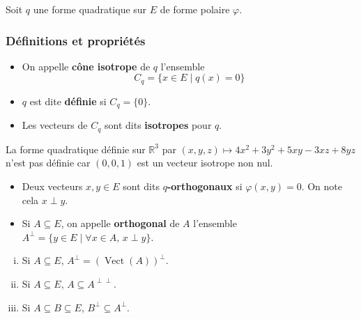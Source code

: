 	Soit $q$ une forme quadratique sur $E$ de forme polaire $\varphi$.

	\subsubsection{Définitions et propriétés}

	\begin{definition}
		\begin{itemize}
			\item On appelle \textbf{cône isotrope} de $q$ l'ensemble
			\[ C_q = \{ x \in E \mid q(x) = 0 \} \]
			\item $q$ est dite \textbf{définie} si $C_q = \{ 0 \}$.
			\item Les vecteurs de $C_q$ sont dits \textbf{isotropes} pour $q$.
		\end{itemize}
	\end{definition}


	\begin{example}
		La forme quadratique définie sur $\mathbb{R}^3$ par $(x, y, z) \mapsto 4x^2 + 3y^2 + 5xy - 3xz + 8yz$ n'est pas définie car $(0,0,1)$ est un vecteur isotrope non nul.
	\end{example}


	\begin{definition}
		\begin{itemize}
			\item Deux vecteurs $x, y \in E$ sont dits \textbf{$q$-orthogonaux} si $\varphi(x, y) = 0$. On note cela $x \perp y$.
			\item Si $A \subseteq E$, on appelle \textbf{orthogonal} de $A$ l'ensemble $A^\perp = \{ y \in E \mid \forall x \in A, \, x \perp y \}$.
		\end{itemize}
	\end{definition}

	\begin{proposition}
		\begin{enumerate}[(i)]
			\item Si $A \subseteq E$, $A^\perp = (\operatorname{Vect}(A))^\perp$.
			\item Si $A \subseteq E$, $A \subseteq A^{\perp\perp}$.
			\item Si $A \subseteq B \subseteq E$, $B^{\perp} \subseteq A^{\perp}$.
		\end{enumerate}
	\end{proposition}

